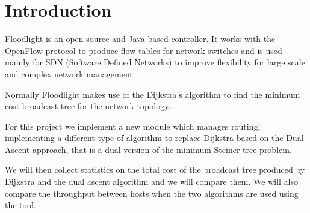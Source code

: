 \chapter{Introduction}\label{ch:intro}

Floodlight is an open source and Java based controller. It works with the
OpenFlow protocol to produce flow tables for network switches and is used mainly
for SDN (Software Defined Networks) to improve flexibility for large scale and
complex network management.

Normally Floodlight makes use of the Dijkstra's algorithm to find the minimum
cost broadcast tree for the network topology.

For this project we implement a new module which manages routing, implementing a
different type of algorithm to replace Dijkstra based on the Dual Ascent
approach, that is a dual version of the minimum Steiner tree problem.

We will then collect statistics on the total cost of the broadcast tree produced
by Dijkstra and the dual ascent algorithm and we will compare them. We will also
compare the throughput between hosts when the two algorithms are used using the
 tool.
